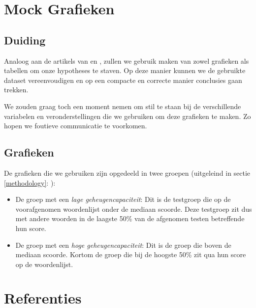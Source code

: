 \documentclass[12pt,a4paper]{article}
\begin{document}
    \newpage
    \section{Mock Grafieken}
    
    	\subsection{Duiding}
    	
    	Analoog aan de artikels van \cite{HenryRoediger2006} en \cite{Agarwal2008}, zullen we gebruik maken van zowel grafieken als tabellen om onze hypotheses te staven. Op deze manier kunnen we de gebruikte dataset vereenvoudigen en op een compacte en correcte manier conclusies gaan trekken.\\
    	\par
    	\noindent
    	We zouden graag toch een moment nemen om stil te staan bij de verschillende variabelen en veronderstellingen die we gebruiken om deze grafieken te maken. Zo hopen we foutieve communicatie te voorkomen.
    	
    	\subsection{Grafieken}
    	
    	De grafieken die we gebruiken zijn opgedeeld in twee groepen (uitgeleind in sectie \ref{methodology}: ):
    	\begin{itemize}
    		\item De groep met een \textit{lage geheugencapaciteit}: Dit is de testgroep die op de voorafgenomen woordenlijst onder de mediaan scoorde. Deze testgroep zit dus met andere woorden in de laagste 50\% van de afgenomen testen betreffende hun score.
    		\item De groep met een \textit{hoge geheugencapaciteit}: Dit is de groep die boven de mediaan scoorde. Kortom de groep die bij de hoogste 50\% zit qua hun score op de woordenlijst.
    	\end{itemize}
    \newpage
    \section{Referenties}
    
	\printbibliography
    
\end{document}
